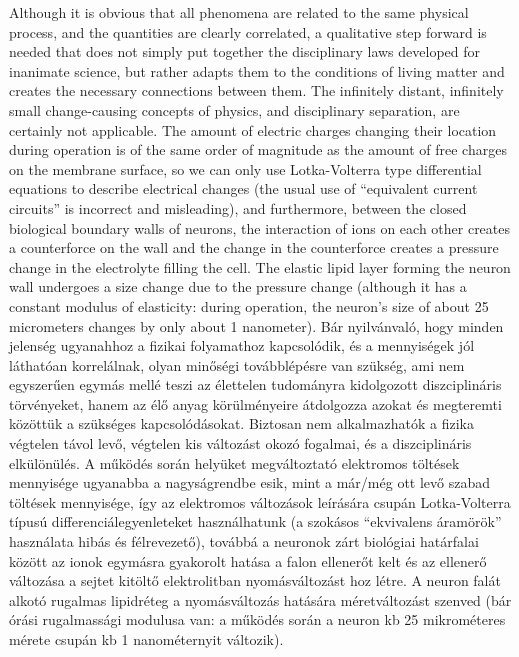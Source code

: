 \ifx\magyar\undefined
Although it is obvious that all phenomena are related to the same physical process, and the quantities are clearly correlated, a qualitative step forward is needed that does not simply put together the disciplinary laws developed for inanimate science, but rather adapts them to the conditions of living matter and creates the necessary connections between them. The infinitely distant, infinitely small change-causing concepts of physics, and disciplinary separation, are certainly not applicable. The amount of electric charges changing their location during operation is of the same order of magnitude as the amount of free charges on the membrane surface, so we can only use Lotka-Volterra type differential equations
to describe electrical changes (the usual use of “equivalent current circuits” is incorrect and misleading), and furthermore, between the closed biological boundary walls of neurons, the interaction of ions on each other creates a counterforce on the wall and the change in the counterforce creates a pressure change in the electrolyte filling the cell. The elastic lipid layer forming the neuron wall undergoes a size change due to the pressure change (although it has a constant modulus of elasticity: during operation, the neuron’s size of about 25 micrometers changes by only about 1 nanometer).
\else
Bár nyilvánvaló, hogy minden jelenség ugyanahhoz a fizikai folyamathoz kapcsolódik, és a mennyiségek jól láthatóan korrelálnak, olyan minőségi továbblépésre van szükség, ami nem egyszerűen egymás mellé teszi az élettelen tudományra kidolgozott diszciplináris törvényeket, hanem az élő anyag körülményeire átdolgozza azokat és megteremti közöttük a szükséges kapcsolódásokat. Biztosan nem alkalmazhatók a fizika végtelen távol levő, végtelen kis változást okozó fogalmai, és a diszciplináris elkülönülés. A működés során helyüket megváltoztató elektromos töltések mennyisége ugyanabba a nagyságrendbe esik, mint a már/még ott levő szabad töltések mennyisége, így az elektromos változások leírására csupán Lotka-Volterra típusú differenciálegyenleteket használhatunk
 (a szokásos “ekvivalens áramörök” használata hibás és félrevezető), továbbá a neuronok zárt biológiai határfalai között az ionok egymásra gyakorolt hatása a falon ellenerőt kelt és az ellenerő változása a sejtet kitöltő elektrolitban nyomásváltozást hoz létre. A neuron falát alkotó rugalmas lipidréteg a nyomásváltozás hatására méretváltozást szenved (bár órási rugalmassági modulusa van: a működés során a neuron kb 25 mikrométeres mérete csupán kb 1 nanométernyit változik). 
\fi


